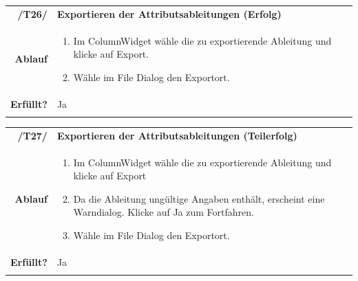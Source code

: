 \documentclass{article}
\begin{document}
\begin{table}[H]
\begin{tabularx}{\textwidth}{rX}
\vspace{1mm}
\textbf{/T26/}         & \textbf{Exportieren der Attributsableitungen (Erfolg)} \\ \vspace{1mm}
\textbf{Ablauf} & 
\begin{enumerate}
        \item Im ColumnWidget wähle die zu exportierende Ableitung und klicke auf Export.
        \item Wähle im File Dialog den Exportort.
    \end{enumerate} \\ \vspace{1mm}
\textbf{Erfüllt?}  &  Ja \\ \vspace{1mm}
\end{tabularx}
\end{table}

\begin{table}[H]
\begin{tabularx}{\textwidth}{rX}
\vspace{1mm}
\textbf{/T27/}         & \textbf{Exportieren der Attributsableitungen (Teilerfolg)} \\ \vspace{1mm}
\textbf{Ablauf} & 
\begin{enumerate}
        \item Im ColumnWidget wähle die zu exportierende Ableitung und klicke auf Export
        \item Da die Ableitung ungültige Angaben enthält, erscheint eine Warndialog. Klicke auf Ja zum Fortfahren.
        \item Wähle im File Dialog den Exportort.
    \end{enumerate} \\ \vspace{1mm}
\textbf{Erfüllt?}  & Ja \\ \vspace{1mm}
\end{tabularx}
\end{table}
\end{document}
